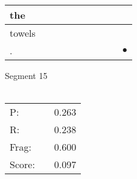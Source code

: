 \documentclass[landscape]{article}
\newcommand{\ssp}{\hspace{2pt}}
\newcommand{\mex}{\cellcolor{g}$\bullet$}
\begin{document}
\begin{tabular}{|l|p{10pt}|p{10pt}|p{10pt}|p{10pt}|p{10pt}|p{10pt}|p{10pt}|p{10pt}|p{10pt}|}
\hline
\ssp the \ssp&\hspace{2pt}&\hspace{2pt}&\hspace{2pt}&\hspace{2pt}&\hspace{2pt}&\hspace{2pt}&\hspace{2pt}&\hspace{2pt}&\hspace{2pt}\\
\hline
\ssp towels \ssp&\hspace{2pt}&\hspace{2pt}&\hspace{2pt}&\hspace{2pt}&\hspace{2pt}&\hspace{2pt}&\hspace{2pt}&\hspace{2pt}&\hspace{2pt}\\
\hline
\ssp \cellcolor{ref8}. \ssp&\hspace{2pt}&\hspace{2pt}&\hspace{2pt}&\hspace{2pt}&\hspace{2pt}&\hspace{2pt}&\hspace{2pt}&\hspace{2pt}&\hspace{2pt}\mex\\
\hline
\end{tabular}

\vspace{6pt}
\noindent Segment 15\\\\
\noindent\begin{tabular}{lm{12pt}r}
\hline
P:&&0.263\\
R:&&0.238\\
Frag:&&0.600\\
Score:&&0.097\\
\end{tabular}

\newpage
\end{document}
